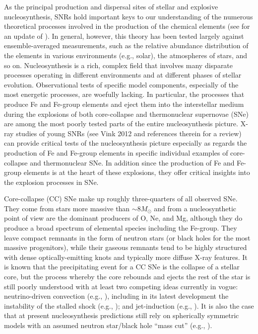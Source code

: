 \documentclass[11pt,a4paper]{article}
\begin{document}
As the principal production and dispersal sites of stellar and
explosive nucleosynthesis, SNRs hold important keys to our
understanding of the numerous theoretical processes involved in the
production of the chemical elements (see \citealt{wallerstein97} for
an update of \citealt{burbidge57}). In general, however, this theory has been
tested largely against ensemble-averaged measurements, such as the
relative abundance distribution of the elements in various
environments (e.g., solar), the atmospheres of stars, and so on.
Nucleosynthesis is a rich, complex field that involves many disparate
processes operating in different environments and at different phases
of stellar evolution. Observational tests of specific model
components, especially of the most energetic processes, are woefully
lacking.  In particular, the processes that produce Fe and Fe-group
elements and eject them into the interstellar medium during the
explosions of both core-collapse and thermonuclear supernovae (SNe)
are among the most poorly tested parts of the entire nucleosynthesis
picture.  X-ray studies of young SNRs (see Vink 2012
and references therein for a review) can provide
critical tests of the nucleosynthesis picture especially as regards
the production of Fe and Fe-group elements in specific individual
examples of core-collapse and thermonuclear SNe.  In addition since
the production of Fe and Fe-group elements is at the heart of these
explosions, they offer critical insights into the explosion processes
in SNe.

Core-collapse (CC) SNe make up roughly three-quarters of all observed
SNe.  They come from stars more massive than $\sim$$8 M_\odot$ and from a
nucleosynthetic point of view are the dominant producers of O, Ne, and
Mg, although they do produce a broad spectrum of elemental species
including the Fe-group. They leave compact remnants in the form of
neutron stars (or black holes for the most massive progenitors), 
while their gaseous remnants tend to be
highly structured with dense optically-emitting knots and typically
more diffuse X-ray features.  It is known that the precipitating event
for a CC SNe is the collapse of a stellar core, but the process
whereby the core rebounds and ejects the rest of the star is still
poorly understood with at least two competing ideas currently in
vogue: neutrino-driven convection (e.g., \citealt{herant94, burrows95,
  kifonidis00}), including in its latest development the instability
of the stalled shock (e.g., \citealt{blondin06, foglizzo06, burrows07,
  scheck08}); and jet-induction (e.g., \citealt{khokhlov99}).  It is
also the case that at present nucleosynthesis predictions still rely
on spherically symmetric models with an assumed neutron star/black
hole ``mass cut'' (e.g., \citealt{woosley07}).
\end{document}

